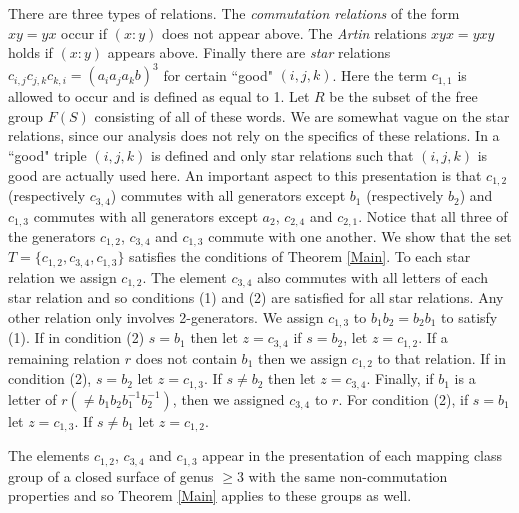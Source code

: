 \documentclass[12pt]{article}
\numberwithin{equation}{section}
\begin{document}
There are three types of relations. The {\it commutation relations} of the form $xy=yx$ occur if $(x:y)$ does not appear above. The {\it Artin} relations $xyx=yxy$ holds if $(x:y)$ appears above. 
Finally there are {\it star} relations $c_{i,j}c_{j,k}c_{k,i}=(a_ia_ja_kb)^3$ for certain ``good" $(i,j,k)$. Here the term $c_{1,1}$ is allowed to occur and is defined as equal to 1. 
Let $R$ be the subset of the free group $F(S)$ consisting of all of these words. We are somewhat vague on the star relations, since our analysis does not rely on the specifics of these relations. In \cite{Ge01} a ``good" triple $(i,j,k)$ is defined and only star relations such that $(i,j,k)$ is good are actually used here. 
 An important aspect to this presentation is that $c_{1,2}$ (respectively $c_{3,4}$) commutes with all generators except $b_1$ (respectively $b_2$) and $c_{1,3}$ commutes with all generators except $a_2$, $c_{2,4}$ and $c_{2,1}$. Notice that all three of the generators $c_{1,2}$, $c_{3,4}$ and $c_{1,3}$ commute with one another. We show that the set $T=\{c_{1,2},c_{3,4},c_{1,3}\}$  satisfies the conditions of Theorem \ref{Main}.    
To each star relation we assign $c_{1,2}$. The element $c_{3,4}$ also commutes with all letters of each star relation and so conditions (1) and (2) are satisfied for all star relations.  Any other relation only involves 2-generators. We assign $c_{1,3}$ to $b_1b_2=b_2b_1$ to satisfy (1). If in condition (2) $s=b_1$ then let $z=c_{3,4}$ if $s=b_2$, let $z=c_{1,2}$. If a remaining relation $r$ does not contain $b_1$ then we assign $c_{1,2}$ to that relation. If in condition (2), $s=b_2$ let $z=c_{1,3}$. If $s\ne b_2$ then let $z=c_{3,4}$. Finally, if $b_1$ is a letter of $r(\ne b_1b_2b_1^{-1}b_2^{-1})$, then we assigned $c_{3,4}$ to $r$. For condition (2), if $s=b_1$ let $z=c_{1,3}$. If $s\ne b_1$ let $z=c_{1,2}$. 

The elements $c_{1,2}$, $c_{3,4}$ and $c_{1,3}$  appear in the \cite{Ge01}  presentation of each mapping class group of a closed surface of genus $\geq 3$ with the same non-commutation properties and so Theorem \ref{Main} applies to these groups as well.


{}
\end{document}
